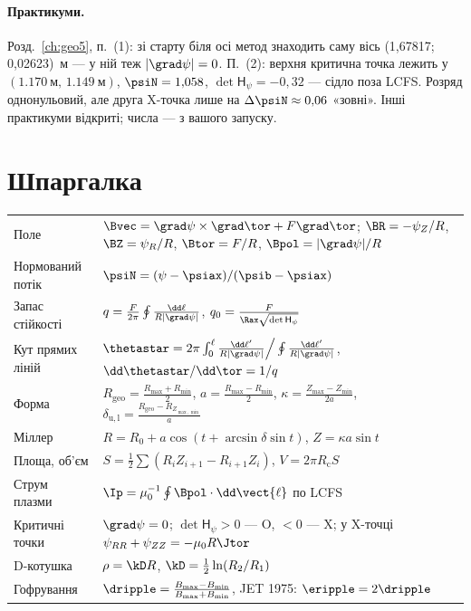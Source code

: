 \paragraph{Практикуми.} Розд.~\ref{ch:geo5}, п.~(1): зі старту біля осі метод знаходить саму вісь (1,67817; 0,02623)~м --- у ній теж $|\grad\psi|=0$. П.~(2): верхня критична точка лежить у $(\SI{1,170}{м},\,\SI{1,149}{м})$, $\psiN=1{,}058$, $\det\mathsf{H}_\psi=-0{,}32$ --- сідло поза LCFS. Розряд однонульовий, але друга X-точка лише на $\Delta\psiN\approx0{,}06$ «зовні». Інші практикуми відкриті; числа --- з вашого запуску.

\section{Шпаргалка}\label{sec:geoA-cheat}

\begin{cheat}
\small
\begin{tabular}{@{}p{}p{}@{}}
Поле & $\Bvec=\grad\psi\times\grad\tor+F\grad\tor$; $\BR=-\psi_Z/R$, $\BZ=\psi_R/R$, $\Btor=F/R$, $\Bpol=|\grad\psi|/R$\\[2pt]
Нормований потік & $\psiN=(\psi-\psiax)/(\psib-\psiax)$\\[2pt]
Запас стійкості & $q=\frac{F}{2\pi}\oint\frac{\dd\ell}{R|\grad\psi|}$, \quad $q_0=\frac{F}{\Rax\sqrt{\det\mathsf{H}_\psi}}$\\[2pt]
Кут прямих ліній & $\thetastar=2\pi\int_0^\ell\frac{\dd\ell'}{R|\grad\psi|}\Big/\oint\frac{\dd\ell'}{R|\grad\psi|}$, \quad $\dd\thetastar/\dd\tor=1/q$\\[2pt]
Форма & $R_{\mathrm{geo}}=\frac{R_{\max}+R_{\min}}2$, $a=\frac{R_{\max}-R_{\min}}2$, $\kappa=\frac{Z_{\max}-Z_{\min}}{2a}$, $\delta_{\mathrm{u,l}}=\frac{R_{\mathrm{geo}}-R_{Z_{\max,\min}}}a$\\[2pt]
Міллер & $R=R_0+a\cos(t+\arcsin\delta\sin t)$, $Z=\kappa a\sin t$\\[2pt]
Площа, об'єм & $S=\frac12\sum(R_iZ_{i+1}-R_{i+1}Z_i)$, \quad $V=2\pi R_{\mathrm c}S$\\[2pt]
Струм плазми & $\Ip=\mu_0^{-1}\oint\Bpol\cdot\dd\vect{\ell}$ по LCFS\\[2pt]
Критичні точки & $\grad\psi=0$; $\det\mathsf{H}_\psi>0$ --- O, $<0$ --- X; у X-точці $\psi_{RR}+\psi_{ZZ}=-\mu_0R\Jtor$\\[2pt]
D-котушка & $\rho=\kD R$, $\kD=\frac12\ln(R_2/R_1)$\\[2pt]
Гофрування & $\dripple=\frac{B_{\max}-B_{\min}}{B_{\max}+B_{\min}}$, JET 1975: $\eripple=2\dripple$\\
\end{tabular}
\end{cheat}

